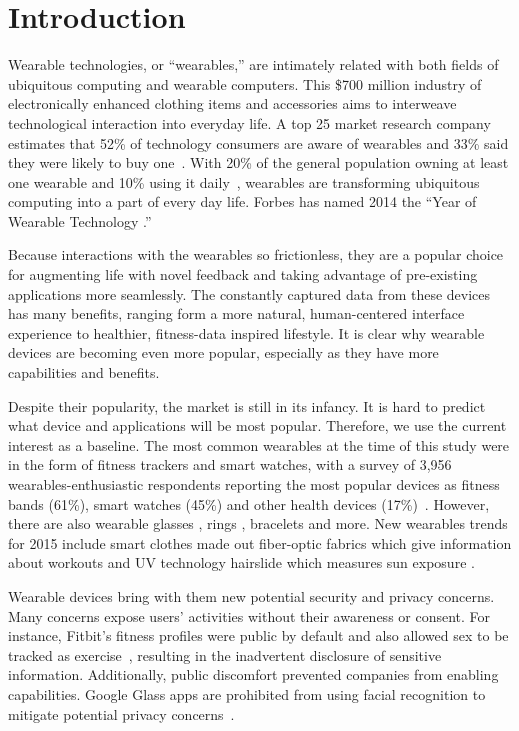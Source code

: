 
\section{Introduction}

Wearable technologies, or ``wearables,'' are intimately related with both fields of ubiquitous computing and wearable computers. This \$700 million industry \cite{cmo} of electronically enhanced clothing items and accessories aims to interweave technological interaction into everyday life. A top 25 market research company estimates that 52\% of technology consumers are aware of wearables and 33\% said they were likely to buy one~\cite{NPD}. With 20\% of the general population owning at least one wearable and 10\% using it daily~\cite{WearableStatNews}, wearables are transforming ubiquitous computing into a part of every day life. Forbes has named 2014 the ``Year of Wearable Technology \cite{Forbes}.''

Because interactions with the wearables so frictionless, they are a popular choice for augmenting life with novel feedback and taking advantage of pre-existing applications more seamlessly. The constantly captured data from these devices has many benefits, ranging form a more natural, human-centered interface experience to healthier, fitness-data inspired lifestyle. It is clear why wearable devices are becoming even more popular, especially as they have more capabilities and benefits. 

Despite their popularity, the market is still in its infancy. It is hard to predict what device and applications will be most popular. Therefore, we use the current interest as a baseline. The most common wearables at the time of this study were in the form of fitness trackers and smart watches, with a survey of 3,956 wearables-enthusiastic respondents reporting the most popular devices as fitness bands (61\%), smart watches (45\%) and other health devices (17\%)~\cite{Nilsen}.  However, there are also wearable glasses \cite{ 2_google_2014, 3_sony_global_2014}, rings \cite{4_ringly_2014}, bracelets \cite{5_intel_2014} and more. New wearables trends for 2015 include smart clothes made out fiber-optic fabrics which give information about workouts and UV technology hairslide which measures sun exposure \cite{1_digital_trends_2014, 2_arthur_2014}.

Wearable devices bring with them new potential security and privacy concerns. Many concerns expose users' activities without their awareness or consent. For instance, Fitbit's fitness profiles were public by default and also allowed sex to be tracked as exercise~\cite{Fitbit}, resulting in the inadvertent disclosure of sensitive information. Additionally, public discomfort prevented companies from enabling capabilities. Google Glass apps are prohibited from using facial recognition to mitigate potential privacy concerns~\cite{GlassDetection}.

